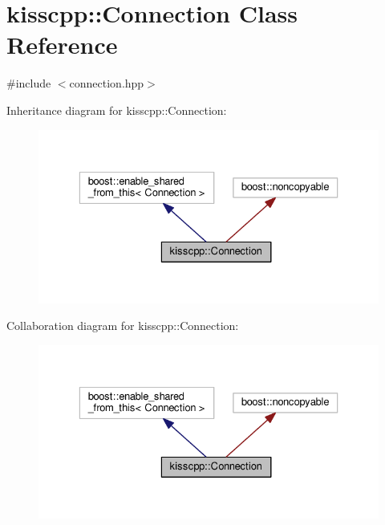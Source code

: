 \hypertarget{classkisscpp_1_1_connection}{\section{kisscpp\-:\-:Connection Class Reference}
\label{classkisscpp_1_1_connection}
}


{\ttfamily \#include $<$connection.\-hpp$>$}



Inheritance diagram for kisscpp\-:\-:Connection\-:\nopagebreak
\begin{figure}[H]
\begin{center}
\leavevmode
\includegraphics[width=329pt]{classkisscpp_1_1_connection__inherit__graph}
\end{center}
\end{figure}


Collaboration diagram for kisscpp\-:\-:Connection\-:\nopagebreak
\begin{figure}[H]
\begin{center}
\leavevmode
\includegraphics[width=329pt]{classkisscpp_1_1_connection__coll__graph}
\end{center}
\end{figure}
